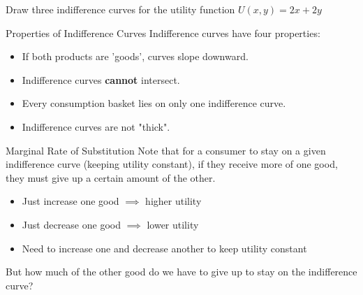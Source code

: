 \documentclass[12pt,t]{beamer}
\begin{document}
\begin{frame}

  \bigskip
  Draw three indifference curves for the utility function $U(x, y) = 2x + 2y$
\end{frame}

\begin{frame}{Properties of Indifference Curves}
  Indifference curves have four properties:

  \begin{itemize}
    \item If both products are 'goods', curves slope downward.

    \item Indifference curves \textbf{cannot} intersect.

    \item Every consumption basket lies on only one indifference curve.

    \item Indifference curves are not "thick".
  \end{itemize}

\end{frame}

\begin{frame}{Marginal Rate of Substitution}
  Note that for a consumer to stay on a given indifference curve (keeping utility constant), if they receive more of one good, they must give up a certain amount of the other. 
  
  \pause\bigskip
  \begin{itemize}
    \item Just increase one good $\implies$ higher utility
    \item Just decrease one good $\implies$ lower utility
    \item Need to increase one and decrease another to keep utility constant
  \end{itemize}

  \pause\bigskip
  But how much of the other good do we have to give up to stay on the indifference curve?
\end{frame}
\end{document}
